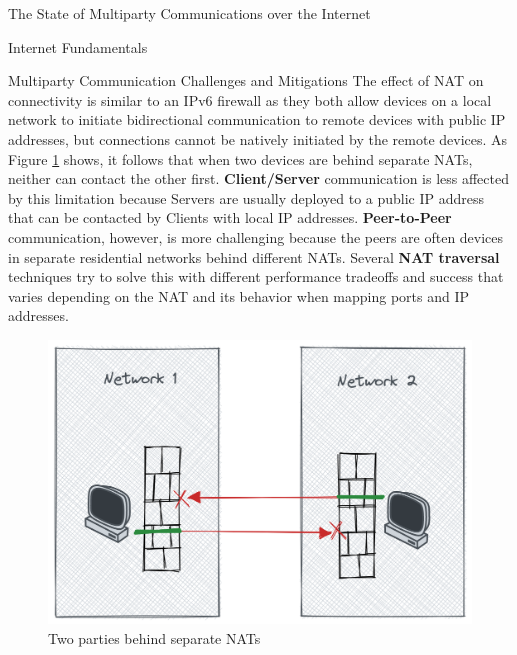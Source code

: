 \begin{frame}[fragile]{The State of Multiparty Communications over the
Internet}
\begin{block}{Internet Fundamentals}
\begin{block}{Multiparty Communication Challenges and Mitigations}
The effect of NAT on connectivity is similar to an IPv6 firewall as they
both allow devices on a local network to initiate bidirectional
communication to remote devices with public IP addresses, but
connections cannot be natively initiated by the remote devices. As
Figure \ref{nat-intro} shows, it follows that when two devices are
behind separate NATs, neither can contact the other first.
\textbf{Client/Server} communication is less affected by this limitation
because Servers are usually deployed to a public IP address that can be
contacted by Clients with local IP addresses. \textbf{Peer-to-Peer}
communication, however, is more challenging because the peers are often
devices in separate residential networks behind different NATs. Several
\textbf{NAT traversal} techniques try to solve this with different
performance tradeoffs and success that varies depending on the NAT
\autocite{natBehaviorRFC} and its behavior when mapping ports and IP
addresses.

\begin{figure}
\centering
\includegraphics[width=\textwidth,height=0.25\textheight]{thesis/../figures/nat-intro.png}
\caption{Two parties behind separate NATs\label{nat-intro}}
\end{figure}


\end{block}
\end{block}
\end{frame}
